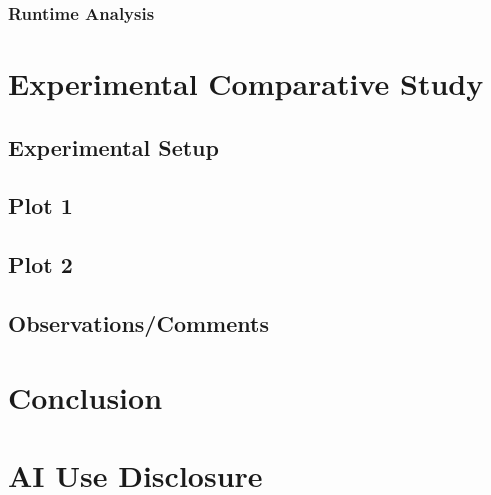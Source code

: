\documentclass{article}
\begin{document}
\subsubsection{Runtime Analysis}

\section{Experimental Comparative Study}

\subsection{Experimental Setup}

\subsection{Plot 1}

\subsection{Plot 2}

\subsection{Observations/Comments}

\section{Conclusion}

\section{AI Use Disclosure}
\end{document}

